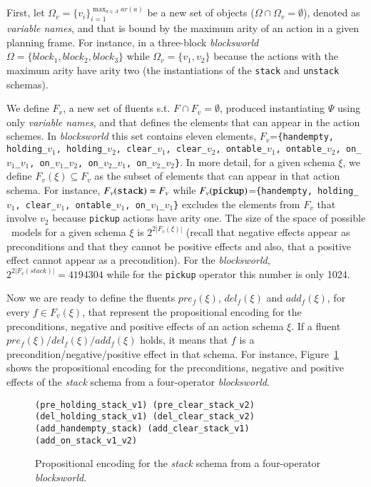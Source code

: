 First, let $\Omega_v=\{v_i\}_{i=1}^{\operatorname*{max}_{a\in A} ar(a)}$ be a new set of objects ($\Omega\cap\Omega_v=\emptyset$), denoted as {\em variable names}, and that is bound by the maximum arity of an action in a given planning frame. For instance, in a three-block {\em blocksworld} $\Omega=\{block_1, block_2, block_3\}$ while $\Omega_v=\{v_1, v_2\}$ because the actions with the maximum arity have arity two (the instantiations of the {\small\tt stack} and {\small\tt unstack} schemas).

We define $F_v$, a new set of fluents s.t. $F\cap F_v=\emptyset$, produced instantiating $\Psi$ using only {\em variable names}, and that defines the elements that can appear in the action schemes. In {\em blocksworld} this set contains eleven elements, $F_v$={\small\tt\{handempty, holding\_$v_1$, holding\_$v_2$, clear\_$v_1$, clear\_$v_2$, ontable\_$v_1$, ontable\_$v_2$, on\_$v_1$\_$v_1$, on\_$v_1$\_$v_2$, on\_$v_2$\_$v_1$, on\_$v_2$\_$v_2$\}}. In more detail, for a given schema $\xi$, we define $F_v(\xi)\subseteq F_v$ as the subset of elements that can appear in that action schema. For instance, $F_v({\tt stack})=F_v$ while $F_v({\tt pickup})$={\small\tt\{handempty, holding\_$v_1$, clear\_$v_1$, ontable\_$v_1$, on\_$v_1$\_$v_1$\}} excludes the elements from $F_v$ that involve $v_2$ because {\small\tt pickup} actions have arity one. The size of the space of possible \strips\ models for a given schema $\xi$ is $2^{2|F_v(\xi)|}$ (recall that negative effects appear as preconditions and that they cannot be positive effects and also, that a positive effect cannot appear as a precondition). For the {\em blocksworld}, $2^{2|F_v(stack)|}=4194304$ while for the {\tt pickup} operator this number is only 1024.

Now we are ready to define the fluents $pre_f(\xi)$, $del_f(\xi)$ and $add_f(\xi)$, for every $f\in F_v(\xi)$, that represent the propositional encoding for the preconditions, negative and positive effects of an action schema $\xi$. If a fluent $pre_f(\xi)/del_f(\xi)/add_f(\xi)$ holds, it means that $f$ is a precondition/negative/positive effect in that schema. For instance, Figure~\ref{fig:encodedstack} shows the propositional encoding for the preconditions, negative and positive effects of the {\em stack} schema from a four-operator {\em blocksworld}.

\begin{figure}[hbt!]
\begin{footnotesize}
\begin{verbatim}
(pre_holding_stack_v1) (pre_clear_stack_v2)
(del_holding_stack_v1) (del_clear_stack_v2)
(add_handempty_stack) (add_clear_stack_v1) (add_on_stack_v1_v2)
\end{verbatim}
\end{footnotesize}
 \caption{\small Propositional encoding for the {\em stack} schema from a four-operator {\em blocksworld}.}
\label{fig:encodedstack}
\end{figure}


